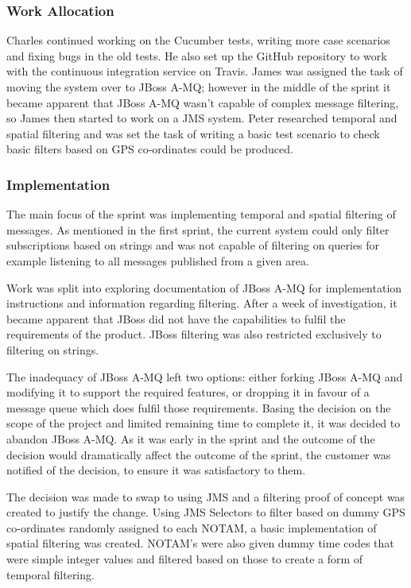 \documentclass[a4paper, 12pt, twoside]{article}
\begin{document}
\subsubsection{Work Allocation}

Charles continued working on the Cucumber tests, writing more case scenarios and fixing bugs in the old tests. He also set up the GitHub repository to work with the continuous integration service on Travis. James was assigned  the task of moving the system over to JBoss A-MQ; however in the middle of the sprint it became apparent that JBoss A-MQ wasn't capable of complex message filtering, so James then started to work on a JMS system. Peter researched temporal and spatial filtering and was set the task of writing a basic test scenario to check basic filters based on GPS co-ordinates could be produced.

\subsubsection{Implementation}

The main focus of the sprint was implementing temporal and spatial filtering of messages. As mentioned in the first sprint, the current system could only filter subscriptions based on strings and was not capable of filtering on queries for example listening to all messages published from a given area.

Work was split into exploring documentation of JBoss A-MQ for implementation instructions and information regarding filtering. After a week of investigation, it became apparent that JBoss did not have the capabilities to fulfil the requirements of the product. JBoss filtering  was also restricted exclusively to filtering on strings.

The inadequacy of JBoss A-MQ left two options: either forking JBoss A-MQ and modifying it to support the required features, or dropping it in favour of a message queue which does fulfil those requirements. Basing the decision on the scope of the project and limited remaining time to complete it, it was decided to abandon JBoss A-MQ. As it was early in the sprint and the outcome of the decision would dramatically affect the outcome of the sprint, the customer was notified of the decision, to ensure it was satisfactory to them.

The decision was made to swap to using JMS and a filtering proof of concept was created to justify the change. Using JMS Selectors to filter based on dummy GPS co-ordinates randomly assigned to each NOTAM, a basic implementation of spatial filtering was created. NOTAM's were also given dummy time codes that were simple integer values and filtered based on those to create a form of temporal filtering.
\end{document}
